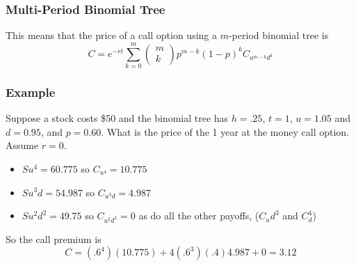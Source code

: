 \documentclass{beamer}
\theoremstyle{plain}
\theoremstyle{definition}
\theoremstyle{remark}
\begin{document}
\begin{frame}
\frametitle{Multi-Period Binomial Tree}

This means that the price of a call option using a $m$-period binomial tree is  \[C = e^{-rt}\sum_{k=0}^m \left(\begin{array}{c} m \\ k \end{array}\right) p^{m-k}(1-p)^k C_{u^{m-k}d^k}\]


\end{frame}


\begin{frame}
\frametitle{Example}

Suppose a stock costs \$50 and the binomial tree has $h = .25$, $t = 1$, $u = 1.05$ and $d = 0.95$,  and $p = 0.60$. What is the price of the 1 year at the money call option. Assume $r=0$. 

\begin{itemize}
\item $Su^4 = 60.775$ so $C_{u^4} = 10.775$
\item $Su^3 d = 54.987$ so $C_{u^3d} = 4.987$
\item $Su^2d^2 = 49.75$ so $C_{u^2d^2} = 0$ as do all the other payoffs, ($C_ud^3$ and $C_d^4$)
\end{itemize}

So the call premium is \[C = (.6^4)(10.775) + 4(.6^3)(.4)4.987 + 0 = 3.12\]


\end{frame}
\end{document}
